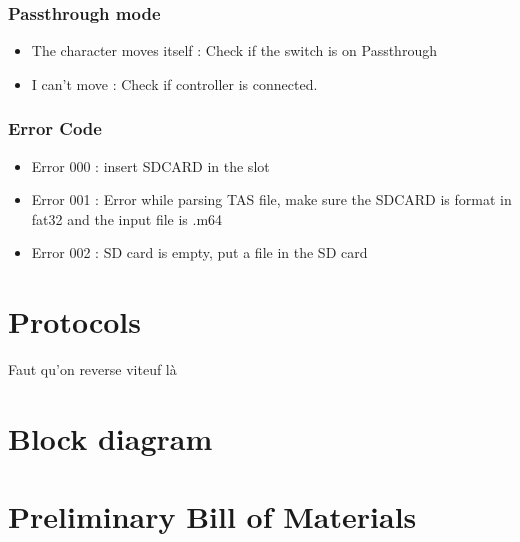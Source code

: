 \documentclass[a4paper,oneside,12pt]{article}
\begin{document}
\subsubsection{Passthrough mode}
\begin{itemize}
\item The character moves itself : Check if the switch is on Passthrough
\item I can't move : Check if controller is connected.
\end{itemize}

\subsubsection{Error Code}
\begin{itemize}
\item Error 000 : insert SDCARD in the slot
\item Error 001 : Error while parsing TAS file, make sure the SDCARD is format 
in fat32 and the input file is .m64
\item Error 002 : SD card is empty, put a file in the SD card
\end{itemize}

\section{Protocols}
Faut qu'on reverse viteuf là

\section{Block diagram}

\section{Preliminary Bill of Materials}
\end{document}
